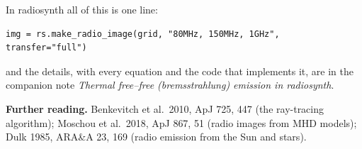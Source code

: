 \documentclass[11pt,a4paper]{article}
\begin{document}
In \textsf{radiosynth} all of this is one line:
\begin{small}
\begin{verbatim}
img = rs.make_radio_image(grid, "80MHz, 150MHz, 1GHz", transfer="full")
\end{verbatim}
\end{small}
and the details, with every equation and the code that implements it, are in the companion note
\emph{Thermal free--free (bremsstrahlung) emission in radiosynth}.

\vspace{6pt}
{\small\textbf{Further reading.} Benkevitch et al.\ 2010, ApJ 725, 447 (the ray-tracing
algorithm); Moschou et al.\ 2018, ApJ 867, 51 (radio images from MHD models); Dulk 1985, ARA\&A 23,
169 (radio emission from the Sun and stars).}
\end{document}

